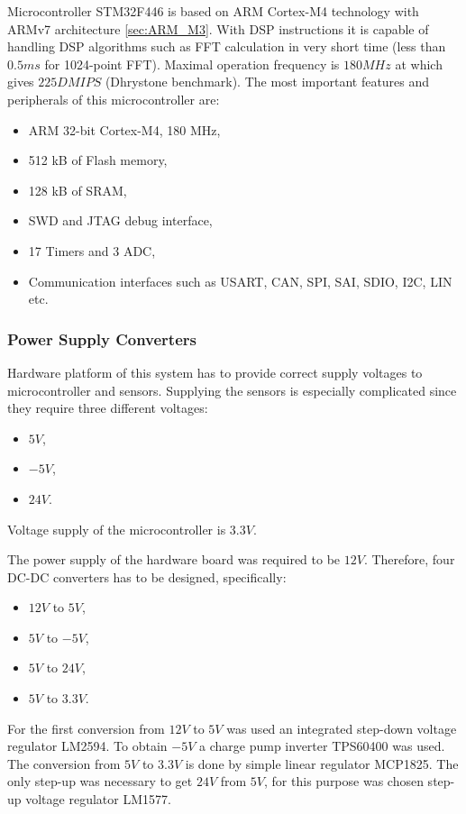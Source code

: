 \documentclass[twoside]{ctuthesis}
\theoremstyle{plain}
\theoremstyle{definition}
\theoremstyle{note}
\begin{document}
	Microcontroller STM32F446 is based on ARM Cortex-M4 technology with ARMv7 architecture \ref{sec:ARM_M3}. With DSP instructions it is capable of handling DSP algorithms such as FFT calculation in very short time (less than $0.5 ms$ for 1024-point FFT). Maximal operation frequency is $180 MHz$ at which gives $225 DMIPS$ (Dhrystone benchmark). The most important features and peripherals of this microcontroller are:
\begin{itemize}
	\setlength{\itemsep}{5pt}
	\item ARM 32-bit Cortex-M4, 180 MHz,
	\item 512 kB of Flash memory,
	\item 128 kB of SRAM,
	\item SWD and JTAG debug interface,
	\item 17 Timers and 3 ADC,
	\item Communication interfaces such as USART, CAN, SPI, SAI, SDIO, I2C, LIN etc.
\end{itemize}	
\subsubsection{Power Supply Converters}
Hardware platform of this system has to provide correct supply voltages to microcontroller and sensors. Supplying the sensors is especially complicated since they require three different voltages:
\begin{itemize}
	\setlength{\itemsep}{5pt}
	\item $5 V$,
	\item $-5 V$,
	\item $24 V$.
\end{itemize}
Voltage supply of the microcontroller is $3.3 V$.

The power supply of the hardware board was required to be $12 V$. Therefore, four DC-DC converters has to be designed, specifically:
\begin{itemize}
	\setlength{\itemsep}{5pt}
	\item $12 V$ to $5 V$,
	\item $5 V$ to $-5 V$,
	\item $5 V$ to $24 V$,
	\item $5 V$ to $3.3 V$.
\end{itemize}

For the first conversion from $12 V$ to $5 V$ was used an integrated step-down voltage regulator LM2594. To obtain $-5 V$ a charge pump inverter TPS60400 was used. The conversion from $5 V$ to $3.3 V$ is done by simple linear regulator MCP1825. The only step-up was necessary to get $24 V$ from $5 V$, for this purpose was chosen step-up voltage regulator LM1577.
\end{document}

